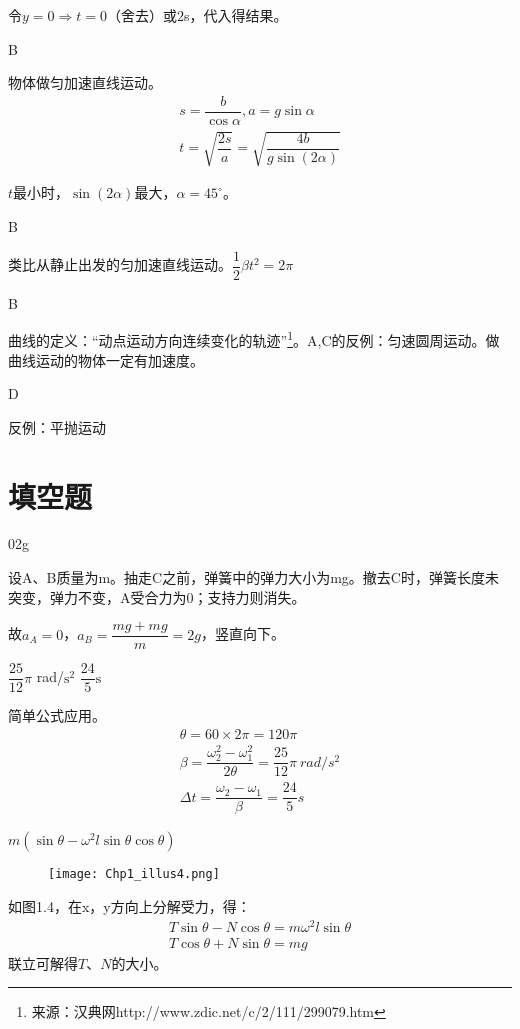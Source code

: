 \documentclass[b5paper,opensource]{./template/qyxf-book}
\begin{document}
令$y=0\Rightarrow t=0\text{（舍去）或}2$s，代入得结果。

B

\solve
物体做匀加速直线运动。
\begin{gather*}
	s=\dfrac{b}{\cos\alpha},a=g\sin\alpha\\
	t=\sqrt{\dfrac{2s}{a}}=\sqrt{\dfrac{4b}{g\sin(2\alpha)}}
\end{gather*}

$t$最小时，$\sin(2\alpha)$最大，$\alpha=45^\circ$。

B

\solve
类比从静止出发的匀加速直线运动。$\dfrac{1}{2}\beta t^2=2\pi$

B

\solve
曲线的定义：“动点运动方向连续变化的轨迹”\footnote{来源：汉典网http://www.zdic.net/c/2/111/299079.htm}。A,C的反例：匀速圆周运动。做曲线运动的物体一定有加速度。

D

\solve
反例：平抛运动

\section{填空题}

0\qquad2g

\solve
设A、B质量为m。抽走C之前，弹簧中的弹力大小为mg。撤去C时，弹簧长度未突变，弹力不变，A受合力为0；支持力则消失。

故$a_A=0$，$a_B=\dfrac{mg+mg}{m}=2g$，竖直向下。

$\dfrac{25}{12}\pi$ rad/$\textrm{s}^2$ \qquad$\dfrac{24}{5} \textrm{s}$

\solve
简单公式应用。
\begin{gather*}
	\text{}\theta=60\times2\pi=120\pi\\
	\beta=\dfrac{\omega_2^2-\omega_1^2}{2\theta}=\dfrac{25}{12}\pi\ rad/s^2\\
	\Delta t=\dfrac{\omega_2-\omega_1}{\beta}=\dfrac{24}{5}s
\end{gather*}

$m(\sin\theta-\omega^2l\sin\theta\cos\theta)$

\solve
\begin{figure}[htbp]
	\centering
	\texttt{[image: Chp1\_illus4.png]}
\end{figure}
如图1.4，在x，y方向上分解受力，得：
\begin{gather*}		
	T\sin\theta-N\cos\theta=m\omega^2l\sin\theta\\
	T\cos\theta+N\sin\theta=mg
\end{gather*}
联立可解得$T$、$N$的大小。
\end{document}
